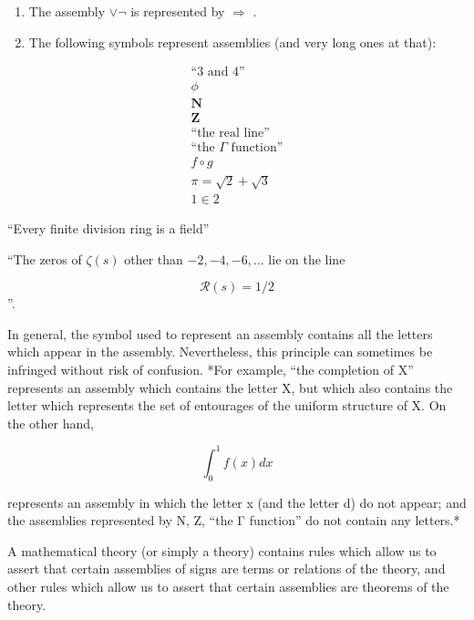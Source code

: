 
\begin{enumerate}
\def\labelenumi{(\arabic{enumi})}
\item
  The assembly \(\vee\neg\) is represented by \(\Longrightarrow\) .
\item
  The following symbols represent assemblies (and very long ones at that):
\end{enumerate}

\[
\begin{gathered}
\text{``3 and 4''} \\
\phi \\
\mathbf{N} \\
\mathbf{Z} \\
\text{``the real line''} \\
\text{``the }\Gamma\text{ function''} \\
f \circ g \\
\pi = \sqrt{2} + \sqrt{3} \\
1 \in 2
\end{gathered}
\]

``Every finite division ring is a field''

``The zeros of \(\zeta(s)\) other than \(-2, -4, -6, \ldots\) lie on the line

\[
\mathcal{R}(s) = 1/2
\]''.

In general, the symbol used to represent an assembly contains all the letters which appear in the assembly. Nevertheless, this principle can sometimes be infringed without risk of confusion. *For example, ``the completion of X'' represents an assembly which contains the letter X, but which also contains the letter which represents the set of entourages of the uniform structure of X. On the other hand,

\[
\int_ {0} ^ {1} f (x) d x
\]

represents an assembly in which the letter x (and the letter d) do not appear; and the assemblies represented by N, Z, ``the Γ function'' do not contain any letters.*

A mathematical theory (or simply a theory) contains rules which allow us to assert that certain assemblies of signs are terms or relations of the theory, and other rules which allow us to assert that certain assemblies are theorems of the theory.

